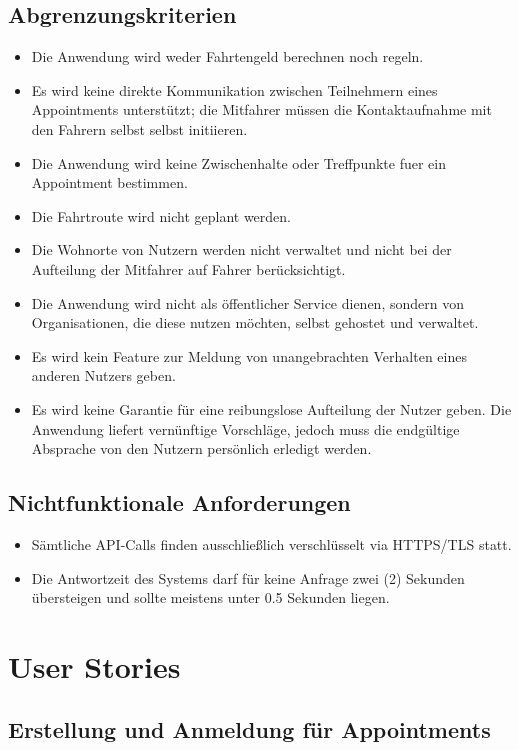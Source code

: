 \documentclass[11pt,a4paper]{article}
\begin{document}
\subsection{Abgrenzungskriterien}
\begin{itemize}
\item Die Anwendung wird weder Fahrtengeld berechnen noch regeln.
\item Es wird keine direkte Kommunikation zwischen Teilnehmern eines Appointments unterstützt; die Mitfahrer müssen die Kontaktaufnahme mit den Fahrern selbst selbst initiieren.
\item Die Anwendung wird keine Zwischenhalte oder Treffpunkte fuer ein Appointment bestimmen.
\item Die Fahrtroute wird nicht geplant werden.
\item Die Wohnorte von Nutzern werden nicht verwaltet und nicht bei der Aufteilung der Mitfahrer auf Fahrer berücksichtigt.
\item Die Anwendung wird nicht als öffentlicher Service dienen, sondern von Organisationen, die diese nutzen möchten, selbst gehostet und verwaltet.
\item Es wird kein Feature zur Meldung von unangebrachten Verhalten eines anderen Nutzers geben.
\item Es wird keine Garantie für eine reibungslose Aufteilung der Nutzer geben. Die Anwendung liefert vernünftige Vorschläge, jedoch muss die endgültige Absprache von den Nutzern persönlich erledigt werden.
\end{itemize}

\subsection{Nichtfunktionale Anforderungen}
\begin{itemize}
\item Sämtliche API-Calls finden ausschließlich verschlüsselt via HTTPS/TLS statt.
\item Die Antwortzeit des Systems darf für keine Anfrage zwei (2) Sekunden übersteigen und sollte meistens unter 0.5 Sekunden liegen.
\end{itemize}


\section{User Stories}
\subsection{Erstellung und Anmeldung für Appointments}
\end{document}
